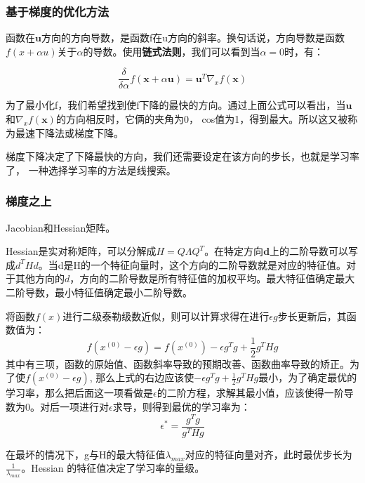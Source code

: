 \subsubsection{基于梯度的优化方法}

函数在$\mathbf{u}$方向的方向导数，是函数f在u方向的斜率。换句话说，方向导数是函数$f(x+\alpha u)$关于$\alpha$的导数。使用\textbf{链式法则}，我们可以看到当$\alpha=0$时，有：

\begin{displaymath}
\frac{\delta}{\delta \alpha} f(\mathbf{x} + \alpha \mathbf{u}) = \mathbf{u}^T \nabla_x f(\mathbf{x})
\end{displaymath}

为了最小化f，我们希望找到使f下降的最快的方向。通过上面公式可以看出，当$\mathbf{u}$和$\nabla_x f(\mathbf{x})$的方向相反时，它俩的夹角为0， cos值为1，得到最大。所以这又被称为最速下降法或梯度下降。

梯度下降决定了下降最快的方向，我们还需要设定在该方向的步长，也就是学习率了， 一种选择学习率的方法是线搜索。

\subsubsection{梯度之上}

Jacobian和Hessian矩阵。

Hessian是实对称矩阵，可以分解成$H = Q\varLambda Q^T$。在特定方向$\mathbf{d}$上的二阶导数可以写成$d^THd$。当d是H的一个特征向量时，这个方向的二阶导数就是对应的特征值。对于其他方向的$d$，方向的二阶导数是所有特征值的加权平均。最大特征值确定最大二阶导数，最小特征值确定最小二阶导数。

将函数$f(x)$进行二级泰勒级数近似，则可以计算求得在进行$\epsilon g$步长更新后，其函数值为：
\begin{displaymath}
f(x^{(0)}-\epsilon g) = f(x^{(0)}) - \epsilon g^T g + \frac{1}{2}g^T H g
\end{displaymath}
其中有三项，函数的原始值、函数斜率导致的预期改善、函数曲率导致的矫正。为了使$f(x^{(0)}-\epsilon g) $, 那么上式的右边应该使$-\epsilon g^T g + \frac{1}{2}g^T H g$最小，为了确定最优的学习率，那么把后面这一项看做是$\epsilon$的二阶方程，求解其最小值，应该使得一阶导数为0。对后一项进行对$\epsilon$求导，则得到最优的学习率为：
\begin{displaymath}
\epsilon^{*} = \frac{g^Tg}{g^THg}
\end{displaymath}

在最坏的情况下，g与H的最大特征值$\lambda_{max}$对应的特征向量对齐，此时最优步长为$\frac{1}{\lambda_{max}}$。Hessian 的特征值决定了学习率的量级。

